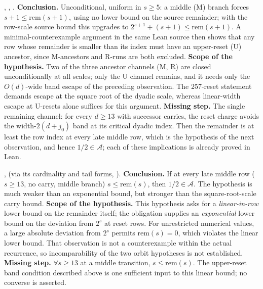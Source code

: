 \begin{obs}
,
,
.
\textbf{Conclusion.} Unconditional, uniform in $s\ge5$: a middle (M) branch forces $s+1 \le
\mathrm{rem}(s+1)$, using no lower bound on the source remainder; with the row-scale source
bound this upgrades to $2^{s+1}+(s+1) \le \mathrm{rem}(s+1)$. A minimal-counterexample argument
in the same Lean source then shows that any row whose remainder is smaller than its index must have an upper-reset (U) ancestor, since M-ancestors
and R-runs are both excluded.
\textbf{Scope of the hypothesis.} Two of the three ancestor channels (M, R) are
closed unconditionally at all scales; only the U channel remains, and it needs only the
$O(d)$-wide band escape of the preceding observation.  The 257-reset statement demands escape
at the square root of the dyadic scale, whereas linear-width escape at U-resets alone suffices
for this argument.
\textbf{Missing step.} The single remaining channel: for every $d \ge 13$ with successor
carries, the reset charge avoids the width-$2(d+j_0)$ band at its critical dyadic index.  Then
the remainder is at least the row index at every late middle row, which is the hypothesis of
the next observation, and hence $1/2 \in \ensuremath{\mathcal A}$; each of these implications is
already proved in Lean.
\end{obs}

\begin{obs}
,
(via its cardinality and tail forms, ).
\textbf{Conclusion.} If at every late middle row ($s \ge 13$, no carry, middle branch)
$s \le \mathrm{rem}(s)$, then $1/2 \in \ensuremath{\mathcal A}$.  The hypothesis is much
weaker than an exponential bound, but stronger than the square-root-scale carry bound.
\textbf{Scope of the hypothesis.} This hypothesis asks for a \emph{linear-in-row}
lower bound on the remainder itself; the obligation supplies an \emph{exponential} lower bound
on the deviation from $2^s$ at reset rows. For unrestricted numerical values, a large absolute deviation from
$2^s$ permits $\mathrm{rem}(s)=0$, which violates the linear lower bound.
That observation is not a counterexample within the actual recurrence,
so incomparability of the two orbit hypotheses is not established.
\textbf{Missing step.} $\forall s \ge 13$ at a middle transition, $s \le \mathrm{rem}(s)$.
The upper-reset band condition described above is one sufficient input
to this linear bound; no converse is asserted.
\end{obs}

